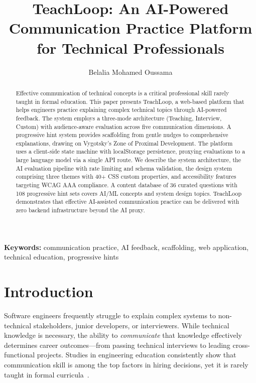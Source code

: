 \documentclass[11pt]{article}
\begin{document}
\title{TeachLoop: An AI-Powered Communication Practice Platform for Technical Professionals}

\author{Belalia Mohamed Oussama}

\maketitle

\begin{abstract}
Effective communication of technical concepts is a critical professional skill rarely taught in formal education. This paper presents TeachLoop, a web-based platform that helps engineers practice explaining complex technical topics through AI-powered feedback. The system employs a three-mode architecture (Teaching, Interview, Custom) with audience-aware evaluation across five communication dimensions. A progressive hint system provides scaffolding from gentle nudges to comprehensive explanations, drawing on Vygotsky's Zone of Proximal Development. The platform uses a client-side state machine with localStorage persistence, proxying evaluations to a large language model via a single API route. We describe the system architecture, the AI evaluation pipeline with rate limiting and schema validation, the design system comprising three themes with 40+ CSS custom properties, and accessibility features targeting WCAG AAA compliance. A content database of 36 curated questions with 108 progressive hint sets covers AI/ML concepts and system design topics. TeachLoop demonstrates that effective AI-assisted communication practice can be delivered with zero backend infrastructure beyond the AI proxy.
\end{abstract}

\noindent\textbf{Keywords:} communication practice, AI feedback, scaffolding, web application, technical education, progressive hints

\vspace{0.3cm}

\section{Introduction}
\label{sec:intro}

Software engineers frequently struggle to explain complex systems to non-technical stakeholders, junior developers, or interviewers. While technical knowledge is necessary, the ability to \emph{communicate} that knowledge effectively determines career outcomes---from passing technical interviews to leading cross-functional projects. Studies in engineering education consistently show that communication skill is among the top factors in hiring decisions, yet it is rarely taught in formal curricula~\cite{deeplearning}.
\end{document}
